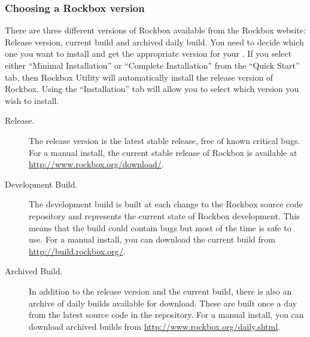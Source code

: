 \subsubsection{Choosing a Rockbox version}\label{sec:choosing_version}

There are three different versions of Rockbox available from the
Rockbox website:
\label{Version}
Release version, current build and archived daily build. You need to decide which one
you want to install and get the appropriate version for your \dap{}. If you
select either ``Minimal Installation'' or ``Complete Installation'' from the
``Quick Start'' tab, then Rockbox Utility will automatically install the
release version of Rockbox. Using the ``Installation'' tab will allow you
to select which version you wish to install.

\begin{description}

\item[Release.] The release version is the latest stable release, free
   of known critical bugs. For a manual install, the current stable release of Rockbox is
   available at \url{http://www.rockbox.org/download/}.
  
\item[Development Build.] The development build is built at each change to
  the Rockbox source code repository and represents the current state of Rockbox
  development. This means that the build could contain bugs but most of
  the time is safe to use. For a manual install, you can download the current build from  
  \url{http://build.rockbox.org/}.

\item[Archived Build.] In addition to the release version and the current build,
  there is also an archive of daily builds available for download. These are
  built once a day from the latest source code in the repository. For a manual install,
  you can download archived builds from \url{http://www.rockbox.org/daily.shtml}.

\end{description}

